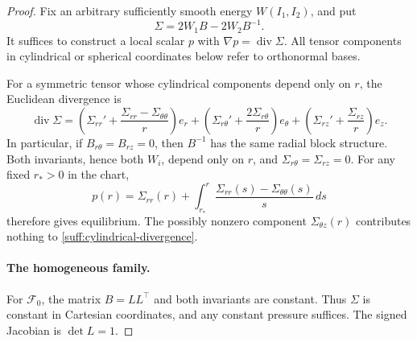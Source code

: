 \documentclass[11pt,a4paper]{article}
\numberwithin{equation}{section}
\theoremstyle{plain}
\theoremstyle{definition}
\theoremstyle{remark}
\begin{document}
\begin{proof}
Fix an arbitrary sufficiently
smooth energy $W(I_1,I_2)$, and put
\begin{equation}\label{suff:elastic-stress}
 \Sigma=2W_1B-2W_2B^{-1}.
\end{equation}
It suffices to construct a local scalar $p$ with $\nabla p=\operatorname{div}\Sigma$.
All tensor components in cylindrical or spherical coordinates below
refer to orthonormal bases.

For a symmetric tensor whose cylindrical components depend only on $r$,
the Euclidean divergence is
\begin{equation}\label{suff:cylindrical-divergence}
 \operatorname{div}\Sigma
 =\left(\Sigma_{rr}'+\frac{\Sigma_{rr}-\Sigma_{\theta\theta}}r\right)e_r
  +\left(\Sigma_{r\theta}'+\frac{2\Sigma_{r\theta}}r\right)e_\theta
  +\left(\Sigma_{rz}'+\frac{\Sigma_{rz}}r\right)e_z .
\end{equation}
In particular, if $B_{r\theta}=B_{rz}=0$, then $B^{-1}$ has the same
radial block structure.  Both invariants, hence both $W_i$, depend only
on $r$, and $\Sigma_{r\theta}=\Sigma_{rz}=0$.  For any fixed $r_*>0$ in the chart,
\begin{equation}\label{suff:cylindrical-pressure}
 p(r)=\Sigma_{rr}(r)+
       \int_{r_*}^{r}\frac{\Sigma_{rr}(s)-\Sigma_{\theta\theta}(s)}s\,ds
\end{equation}
therefore gives equilibrium.  The possibly nonzero component
$\Sigma_{\theta z}(r)$ contributes nothing to
\eqref{suff:cylindrical-divergence}.

\paragraph{The homogeneous family.}
For $\mathcal F_0$, the matrix $B=LL^{\top}$ and both invariants are constant.
Thus $\Sigma$ is constant in Cartesian coordinates, and any constant pressure
suffices.  The signed Jacobian is $\det L=1$.


\end{proof}
\end{document}
